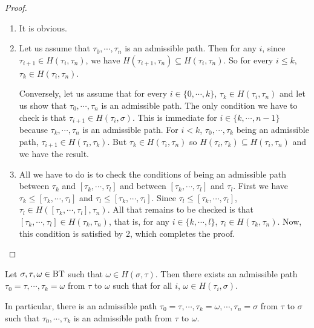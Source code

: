 \documentclass[a4paper,10pt]{amsart}
\begin{document}
\begin{proof}
\begin{enumerate}
\item It is obvious.
\item Let us assume that $\tau_{0},\cdots,\tau_{n}$ is an admissible path. Then for any $i$, since $\tau_{i+1} \in H(\tau_{i},\tau_{n})$, we have $H(\tau_{i+1},\tau_{n}) \subseteq H(\tau_{i},\tau_{n})$. So for every $i \leq k$, $\tau_{k} \in H(\tau_{i},\tau_{n})$.



Conversely, let us assume that for every $i \in \{0,\cdots,k\}$, $\tau_{k} \in H(\tau_{i},\tau_{n})$ and let us show that $\tau_{0},\cdots,\tau_{n}$ is an admissible path. The only condition we have to check is that $\tau_{i+1} \in H(\tau_{i},\sigma)$. This is immediate for $i \in \{k, \cdots, n-1\}$ because $\tau_{k},\cdots,\tau_{n}$ is an admissible path. For $i<k$, $\tau_{0}, \cdots, \tau_{k}$ being an admissible path, $\tau_{i+1} \in H(\tau_{i},\tau_{k})$. But $\tau_{k} \in H(\tau_{i},\tau_{n})$ so $H(\tau_{i},\tau_{k}) \subseteq H(\tau_{i},\tau_{n})$ and we have the result.

\item All we have to do is to check the conditions of being an admissible path between $\tau_{k}$ and $[\tau_{k},\cdots,\tau_{l}]$ and between $[\tau_{k},\cdots,\tau_{l}]$ and $\tau_{l}$. First we have $\tau_{k} \leq [\tau_{k},\cdots,\tau_{l}]$ and $\tau_{l} \leq [\tau_{k},\cdots,\tau_{l}]$. Since $\tau_{l} \leq [\tau_{k},\cdots,\tau_{l}]$, $\tau_{l} \in H([\tau_{k},\cdots,\tau_{l}],\tau_{n})$. All that remains to be checked is that $[\tau_{k},\cdots,\tau_{l}] \in H(\tau_{k},\tau_{n})$, that is, for any $i \in \{k,\cdots,l\}$, $\tau_{i} \in H(\tau_{k},\tau_{n})$. Now, this condition is satisfied by 2, which completes the proof.
\end{enumerate}
\end{proof}

\begin{Lem}
\label{lemCheminOmega}
Let $\sigma,\tau,\omega \in \bt$ such that $\omega \in H(\sigma,\tau)$. Then there exists an admissible path $\tau_{0}=\tau,\cdots,\tau_{k}=\omega$ from $\tau$ to $\omega$ such that for all $i$, $\omega \in H(\tau_{i},\sigma)$.


In particular, there is an admissible path $\tau_{0}=\tau,\cdots,\tau_{k}=\omega,\cdots,\tau_{n}=\sigma$ from $\tau$ to $\sigma$ such that $\tau_{0},\cdots,\tau_{k}$ is an admissible path from $\tau$ to $\omega$.
\end{Lem}
\end{document}
